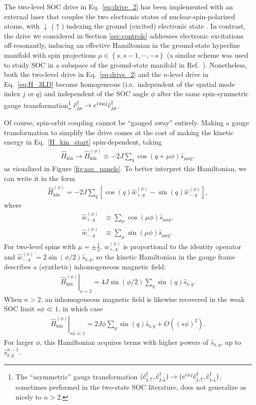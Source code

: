 \documentclass[aps,pra,nofootinbib,twocolumn,superscriptaddress]{revtex4-2}
\renewcommand{\t}{\text} %
\newcommand{\p}[1]{\left(#1\right)} %
\renewcommand{\sp}[1]{\left[#1\right]} %
\renewcommand{\set}[1]{\left\{#1\right\}} %
\renewcommand{\i}{\mathrm{i}\mkern1mu} %
\newcommand{\1}{\mathds{1}}
\renewcommand{\c}{\hat c}
\newcommand{\s}{\hat s}
\renewcommand{\H}{\hat H}
\newcommand{\up}{\uparrow}
\newcommand{\dn}{\downarrow}
\newcommand{\z}{\text{z}}
\begin{document}
The two-level SOC drive in Eq.~\eqref{eq:drive_2} has been implemented with an external laser that couples the two electronic states of nuclear-spin-polarized atoms, with $\dn$ ($\up$) indexing the ground (excited) electronic state \cite{wall2016synthetic, livi2016synthetic, kolkowitz2016spinorbitcoupled, bromley2018dynamics, he2019engineering}.
In contrast, the drive we considered in Section \ref{sec:controls} addresses electronic excitations off-resonantly, inducing an effective Hamiltonian in the ground-state hyperfine manifold with spin projections $\mu\in\set{s,s-1,\cdots,-s}$ (a similar scheme was used to study SOC in a subspace of the ground-state manifold in Ref.~\cite{mancini2015observation}).
Nonetheless, both the two-level drive in Eq.~\eqref{eq:drive_2} and the $n$-level drive in Eq.~\eqref{eq:H_3LD} become homogeneous (i.e.~independent of the spatial mode index $j$ or $q$) and independent of the SOC angle $\phi$ after the same spin-symmetric gauge transformation\footnote{The ``asymmetric'' gauge transformation $(\c_{j,\up}^\dag,\c_{j,\dn}^\dag)\to(e^{\i\phi j} \c_{j,\up}^\dag,\c_{j,\dn}^\dag)$, sometimes performed in the two-state SOC literature, does not generalize as nicely to $n>2$.} $\c_{j\mu}^\dag\to e^{\i\phi\mu j} \c_{j\mu}^\dag$.

Of course, spin-orbit coupling cannot be ``gauged away'' entirely.
Making a gauge transformation to simplify the drive comes at the cost of making the kinetic energy in Eq.~\eqref{H_kin_start} spin-dependent, taking
\begin{align}
  \H_{\t{kin}} \to \H_{\t{kin}}^{(\phi)}
  \equiv -2J \sum_q \cos\p{q+\mu\phi} \s_{\mu\mu q},
\end{align}
as visualized in Figure \ref{fig:soc_panels}.
To better interpret this Hamiltonian, we can write it in the form
\begin{align}
  \H_{\t{kin}}^{(\phi)}
  = -2J \sum_q
  \sp{\cos\p{q} \hat w_{+,q}^{(\phi)} - \sin\p{q} \hat w_{-,q}^{(\phi)}},
\end{align}
where
\begin{align}
  \hat w_{+,q}^{(\phi)} &\equiv \sum_\mu \cos\p{\mu\phi} \s_{\mu\mu q}, \\
  \hat w_{-,q}^{(\phi)} &\equiv \sum_\mu \sin\p{\mu\phi} \s_{\mu\mu q}.
\end{align}
For two-level spins with $\mu=\pm\frac12$, $\hat w_{+,q}^{(\phi)}$ is proportional to the identity operator and $\hat w_{-,q}^{(\phi)} = 2\sin\p{\phi/2} \s_{\z,q}$, so the kinetic Hamiltonian in the gauge frame describes a (synthetic) inhomogeneous magnetic field:
\begin{align}
  \left. \H_{\t{kin}}^{(\phi)} \right|_{n=2}
  = 4 J \sin\p{\phi/2} \sum_q \sin\p{q} \s_{\z,q}.
\end{align}
When $n>2$, an inhomogeneous magnetic field is likewise recovered in the weak SOC limit $s\phi\ll1$, in which case
\begin{align}
  \left. \H_{\t{kin}}^{(\phi)} \right|_{s\phi\ll1}
  = 2J\phi \sum_q \sin\p{q} \s_{\z,q} + O\p{(s\phi)^2}.
\end{align}
For larger $\phi$, this Hamiltonian acquires terms with higher powers of $\s_{\z,q}$, up to $\s_{\z,q}^{n-1}$.
\end{document}
